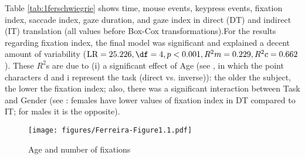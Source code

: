 \documentclass[output=paper]{langscibook}
\begin{document}
\begin{table}
\caption{Time, mouse events, keypress events, fixation index,
saccade index, gaze duration, and gaze index in direct (DT) and indirect (IT) translation. FI: Fixation index; SI: Saccade index; GD: Gaze duration; GI: Gaze index.\label{tab:1ferschwiegrie}}
\end{table}

Table \ref{tab:1ferschwiegrie} shows time, mouse events, keypress events, fixation index, saccade index, gaze duration, and gaze index in direct (DT) and indirect (IT) translation (all values before Box-Cox transformations).\largerpage[2]
For the results regarding fixation index, the final model was significant and explained a decent amount of variability ($\text{LR} = 25.226, \df = 4, p < 0.001, R^2m = 0.229, R^2c = 0.662$). These $R^2$s are due to (i) a significant effect of Age (see , in which the point characters d and i represent the task (direct vs. inverse)): the older the subject, the lower the fixation index; also, there was a significant interaction between Task and Gender (see : females have lower values of fixation index in DT compared to IT; for males it is the opposite).

\begin{figure}
        \texttt{[image: figures/Ferreira-Figure1.1.pdf]}
        \caption{Age and number of fixations\label{fig1h}}
\end{figure}
\end{document}
